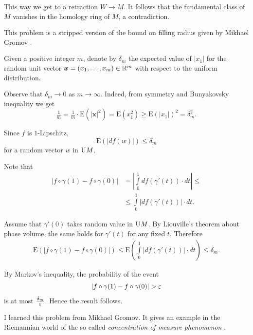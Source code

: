 This way we get 
to a retraction $W\to M$.
It follows that the fundamental class of $M$ vanishes in the homology ring of $M$, 
a contradiction. 
\qeds


This problem is a stripped version of the bound on filling radius given by Mikhael Gromov \cite{gromov-filling}.  

Given a positive integer $m$,
denote by $\delta_m$ 
the expected value of $|x_1|$ for the random unit vector 
$\bm{x}\z=(x_1,\dots,x_m)\z\in\RR^m$ 
with respect to the uniform distribution.

Observe that $\delta_m\to 0$ as $m\to\infty$.
Indeed, from symmetry and Bunyakovsky inequality we get
\[
\tfrac1m=\tfrac1m\cdot\mathrm{E}(|\bm{x}|^2)
=\mathrm{E}(x_1^2)\ge \mathrm{E}(|x_1|)^2=\delta_m^2.
\]

Since $f$ is $1$-Lipschitz,
\[\mathrm{E}(|df(w)|)\le\delta_m\]
for a random vector $w$ in $\mathrm{U} M$.


Note that 
\begin{align*}
|f\circ \gamma(1)-f\circ\gamma(0)|
&=
\left|\int\limits_0^1df(\gamma'(t))\cdot dt\right|\le \\
&\le \int\limits_0^1\left|df(\gamma'(t))\right|\cdot dt.
\end{align*}

Assume that $\gamma'(0)$
takes random value in $\mathrm{U} M$.
By Liouville's theorem about phase volume, the same holds for $\gamma'(t)$
for any fixed $t$.
Therefore
\begin{align*}
\mathrm{E}(|f\circ \gamma(1)-f\circ\gamma(0)|)\le \mathrm{E}\left(\int\limits_0^1|df(\gamma'(t))|\cdot dt\right)\le\delta_m.
\end{align*}

By Markov's inequality,
the probability of the event 
\[|f\circ \gamma(1)-f\circ\gamma(0)|>\eps\]
is at most $\tfrac{\delta_m}{\varepsilon}$.
Hence the result follows.
\qeds

I learned this problem from Mikhael Gromov.
It gives an example in the Riemannian world
of the so called 
\emph{concentration of measure phenomenon}
\cite{milman-schechtman,ledoux}.
